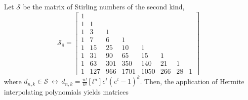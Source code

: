 
\begin{example}
Let $\mathcal{S}$ be the matrix of Stirling numbers of the second kind, 
\begin{displaymath}
\mathcal{S}_{ 8 } = \left[\begin{matrix}1 &  &  &  &  &  &  & \\1 & 1 &  &  &  &  &  & \\1 & 3 & 1 &  &  &  &  & \\1 & 7 & 6 & 1 &  &  &  & \\1 & 15 & 25 & 10 & 1 &  &  & \\1 & 31 & 90 & 65 & 15 & 1 &  & \\1 & 63 & 301 & 350 & 140 & 21 & 1 & \\1 & 127 & 966 & 1701 & 1050 & 266 & 28 & 1\end{matrix}\right]
\end{displaymath}
where $\displaystyle d_{n,k}\in\mathcal{S}\,\leftrightarrow\,d_{n,k}=\frac{n!}{k!}[t^{n}]e^{t}(e^{t}-1)^{k}$.
Then, the application of Hermite interpolating polynomials yields matrices
\begin{displaymath}

\end{displaymath}
\end{example}
